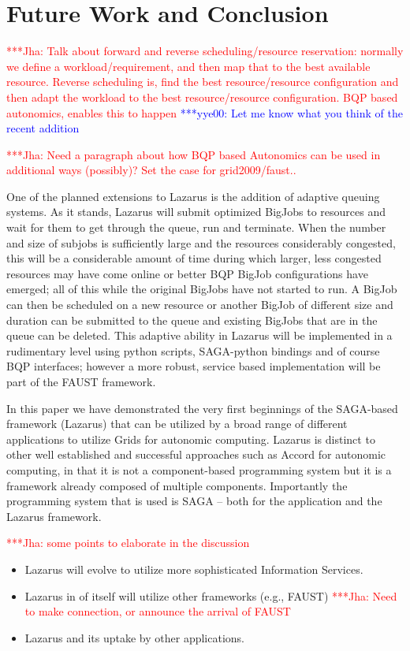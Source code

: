 \documentclass[conference,final]{IEEEtran}
\newcommand{\jhanote}[1]{ {\textcolor{red} { ***Jha: #1 }}}
\newcommand{\yyenote}[1]{ {\textcolor{blue} { ***yye00: #1 }}}
\newcommand{\jhanote}[1]{}
\newcommand{\yyenote}[1]{}
\begin{document}
\section{Future Work and Conclusion}

\jhanote{Talk about forward and reverse scheduling/resource
  reservation: normally we define a workload/requirement, and then map
  that to the best available resource. Reverse scheduling is, find the
  best resource/resource configuration and then adapt the workload to
  the best resource/resource configuration. BQP based autonomics,
  enables this to happen}
\yyenote{Let me know what you think of the recent addition}

\jhanote{Need a paragraph about how BQP based Autonomics can be used
  in additional ways (possibly)? Set the case for grid2009/faust..}

One of the planned extensions to Lazarus is the addition of adaptive
queuing systems. As it stands, Lazarus will submit optimized BigJobs to
resources and wait for them to get through the queue, run and terminate.
 When the number and size of subjobs is
sufficiently large and the resources considerably congested,
this will be a considerable amount of time
during which larger, less congested resources may have come online or better BQP
BigJob configurations have emerged; all of this
while the original BigJobs have not started to run. A BigJob can then be scheduled
on a new resource or another BigJob of different size and duration
can be submitted to the queue and existing BigJobs that are in the queue
can be deleted. This adaptive ability in Lazarus will be implemented
in a rudimentary level using python scripts, SAGA-python bindings and of
course BQP interfaces; however a more robust, service based implementation
will be part of the FAUST framework.

In this paper we have demonstrated the very first beginnings of the
SAGA-based framework (Lazarus) that can be utilized by a broad range
of different applications to utilize Grids for autonomic computing.
Lazarus is distinct to other well established and successful
approaches such as Accord for autonomic computing, in that it is not a
component-based programming system but it is a framework already
composed of multiple components. Importantly the programming system
that is used is SAGA -- both for the application and the Lazarus
framework.

\jhanote{some points to elaborate in the discussion}

\begin{itemize}
\item Lazarus will evolve to utilize more sophisticated Information Services.
\item Lazarus in of itself will utilize other frameworks (e.g., FAUST)
\jhanote{Need to make connection, or announce the arrival of FAUST}
\item Lazarus and its uptake by other applications.
\end{itemize}
\end{document}
